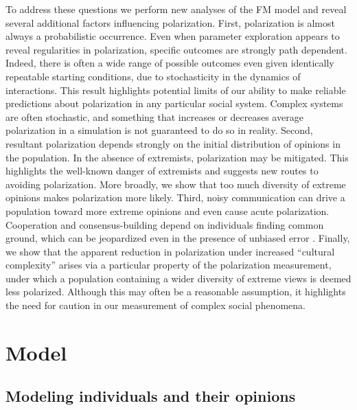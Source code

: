 To address these questions we perform new analyses of the FM model and reveal several additional factors
influencing polarization. First, polarization is almost always a probabilistic
occurrence. Even when parameter exploration appears to reveal regularities in
polarization, specific outcomes are strongly path dependent. Indeed, there is
often a wide range of possible outcomes even given identically repeatable
starting conditions, due to stochasticity in the dynamics of interactions. This
result highlights potential limits of our ability to make reliable
predictions about polarization in any particular social system. Complex systems are
often stochastic, and something that increases or decreases average polarization
in a simulation is not guaranteed to do so in reality.
Second, resultant polarization depends strongly on the initial
distribution of opinions in the population. In the absence of extremists,
polarization may be mitigated. This highlights the well-known danger of
extremists and suggests new routes to avoiding polarization. More broadly, we
show that too much diversity
of extreme opinions makes polarization more likely.
Third, noisy communication can drive a population toward more extreme opinions and even cause acute polarization. Cooperation and consensus-building depend on individuals finding common
ground, which can be jeopardized even in the presence of unbiased error \cite{Clark1996}. 
Finally, we show that the apparent reduction in polarization under increased ``cultural complexity'' arises via a particular property of the polarization measurement, 
under which a population containing a wider diversity of extreme views is 
deemed less polarized. Although this may often be a reasonable assumption, 
it highlights the need for caution in our measurement of complex social phenomena. 



\section{Model}

\subsection{Modeling individuals and their opinions} 

